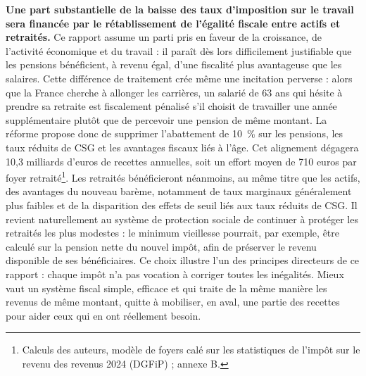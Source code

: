 \documentclass[10pt,a4paper]{article}
\begin{document}
\textbf{Une part substantielle de la baisse des taux d’imposition sur le travail sera financée par le rétablissement de l’égalité fiscale entre actifs et retraités.} Ce rapport assume un parti pris en faveur de la croissance, de l’activité économique et du travail : il paraît dès lors difficilement justifiable que les pensions bénéficient, à revenu égal, d’une fiscalité plus avantageuse que les salaires. Cette différence de traitement crée même une incitation perverse : alors que la France cherche à allonger les carrières, un salarié de 63 ans qui hésite à prendre sa retraite est fiscalement pénalisé s’il choisit de travailler une année supplémentaire plutôt que de percevoir une pension de même montant. La réforme propose donc de supprimer l’abattement de 10~\% sur les pensions, les taux réduits de CSG et les avantages fiscaux liés à l’âge. Cet alignement dégagera 10,3 milliards d’euros de recettes annuelles, soit un effort moyen de 710 euros par foyer retraité\footnote{Calculs des auteurs, modèle de foyers calé sur les statistiques de l'impôt sur le revenu des revenus 2024 (DGFiP) ; annexe B.}. Les retraités bénéficieront néanmoins, au même titre que les actifs, des avantages du nouveau barème, notamment de taux marginaux généralement plus faibles et de la disparition des effets de seuil liés aux taux réduits de CSG. Il revient naturellement au système de protection sociale de continuer à protéger les retraités les plus modestes : le minimum vieillesse pourrait, par exemple, être calculé sur la pension nette du nouvel impôt, afin de préserver le revenu disponible de ses bénéficiaires. Ce choix illustre l’un des principes directeurs de ce rapport : chaque impôt n’a pas vocation à corriger toutes les inégalités. Mieux vaut un système fiscal simple, efficace et qui traite de la même manière les revenus de même montant, quitte à mobiliser, en aval, une partie des recettes pour aider ceux qui en ont réellement besoin.
\end{document}
